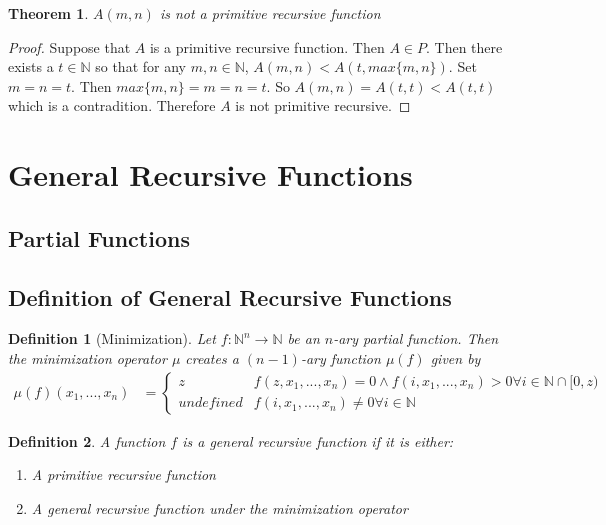 \documentclass[12pt, letterpaper]{article}
\newtheorem{theorem}{Theorem}
\newtheorem*{definition}{Definition}
\theoremstyle{case}
\begin{document}
    \begin{theorem}
      $A(m, n)$ is not a primitive recursive function
    \end{theorem}
    \begin{proof}
      Suppose that $A$ is a primitive recursive function. Then $A \in P$. Then there exists a $t \in \mathbb{N}$
      so that for any $m, n \in \mathbb{N}$, $A(m, n) < A(t, max\{m, n\})$.
      Set $m = n = t$. Then $max\{m, n\} = m = n = t$. So $A(m, n) = A(t, t) < A(t, t)$ which is a contradition.
      Therefore $A$ is not primitive recursive.
    \end{proof}


  \section{General Recursive Functions}
    \subsection{Partial Functions}
    \subsection{Definition of General Recursive Functions}
    \begin{definition}[Minimization]
      Let $f: \mathbb{N}^n \rightarrow \mathbb{N}$ be an $n$-ary partial function. Then the minimization operator $\mu$
      creates a $(n - 1)$-ary function $\mu(f)$ given by
      \begin{equation*}
        \begin{aligned}
          \mu(f)(x_1, ..., x_n) &=
          \begin{cases}
            z                       & f(z, x_1, ..., x_n) = 0 \wedge f(i, x_1, ..., x_n) > 0 \forall i \in \mathbb{N} \cap [0, z) \\
            undefined               & f(i, x_1, ..., x_n) \neq 0 \forall i \in \mathbb{N}
          \end{cases}
        \end{aligned}
      \end{equation*}
    \end{definition}
    \begin{definition}
      A function $f$ is a general recursive function if it is either:
      \begin{enumerate}
        \item A primitive recursive function
        \item A general recursive function under the minimization operator
      \end{enumerate}
    \end{definition}
\end{document}
